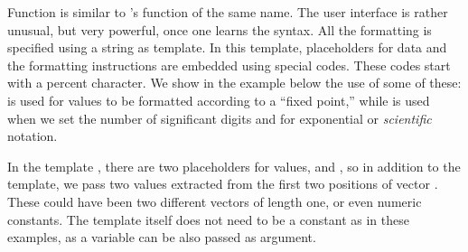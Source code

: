\documentclass[krantz2]{krantz}\usepackage{knitr}
\begin{document}
Function  is similar to \Clang's function of the same name. The user interface is rather unusual, but very powerful, once one learns the syntax. All the formatting is specified using a  string as template. In this template, placeholders for data and the formatting instructions are embedded using special codes. These codes start with a percent character. We show in the example below the use of some of these:  is used for  values to be formatted according to a ``fixed point,'' while  is used when we set the number of significant digits and  for exponential or \emph{scientific} notation.

\begin{knitrout}\footnotesize
{}\color{fgcolor}
\end{knitrout}

In the template , there are two placeholders for  values,  and , so in addition to the template, we pass two values extracted from the first two positions of vector . These could have been two different vectors of length one, or even numeric constants. The template itself does not need to be a  constant as in these examples, as a variable can be also passed as argument.
\end{document}
